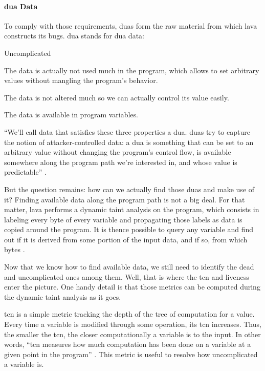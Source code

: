 \paragraph{\acrfull{dua} Data}

To comply with those requirements, \glspl{dua} form the raw material from which \gls{lava} constructs its bugs. \gls{dua} stands for \acrlong{dua} data:

\begin{labeling}{Uncomplicated}
    \item [\emph{Dead}] The data is actually not used much in the program, which allows to set arbitrary values without mangling the program's behavior.
    \item [\emph{Uncomplicated}] The data is not altered much so we can actually control its value easily.
    \item [\emph{Available}] The data is available in program variables.
\end{labeling}

``We'll call data that satisfies these three properties a \gls{dua}. \glspl{dua} try to capture the notion of attacker-controlled data: a \gls{dua} is something that can be set to an arbitrary value without changing the program's control flow, is available somewhere along the program path we're interested in, and whose value is predictable'' \cite{dolan2016mechanics}.

But the question remains: how can we actually find those \glspl{dua} and make use of it? Finding available data along the program path is not a big deal. For that matter, \gls{lava} performs a dynamic taint analysis on the program, which consists in labeling every byte of every variable and propagating those labels as data is copied around the program. It is thence possible to query any variable and find out if it is derived from some portion of the input data, and if so, from which bytes \cite{dolan2016mechanics}.

Now that we know how to find available data, we still need to identify the dead and uncomplicated ones among them. Well, that is where the \acrfull{tcn} and liveness enter the picture. One handy detail is that those metrics can be computed during the dynamic taint analysis as it goes.

\gls{tcn} is a simple metric tracking the depth of the tree of computation for a value. Every time a variable is modified through some operation, its \gls{tcn} increases. Thus, the smaller the \gls{tcn}, the closer computationally a variable is to the input. In other words, ``\gls{tcn} measures how much computation has been done on a variable at a given point in the program'' \cite{dolan2016mechanics}. This metric is useful to resolve how uncomplicated a variable is.

